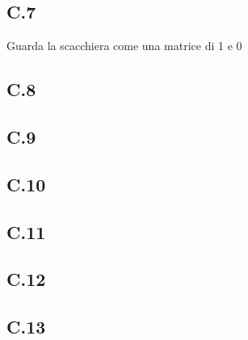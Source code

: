 \documentclass[a4paper]{article}
\begin{document}
\subsection{C.7}
Guarda la scacchiera come una matrice di 1 e 0
\subsection{C.8}
\subsection{C.9}
\subsection{C.10}
\subsection{C.11}
\subsection{C.12}
\subsection{C.13}
\end{document}
